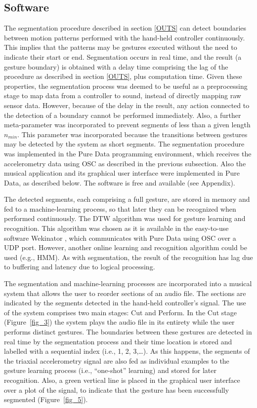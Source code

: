 \documentclass{nime-alternate_MANUSCRIPT} %
\begin{document}
\subsection{Software}

The segmentation procedure described in section \ref{OUTS} can detect boundaries between motion patterns performed with the hand-held controller continuously. This implies that the patterns may be gestures executed without the need to indicate their start or end. Segmentation occurs in real time, and the result (a gesture boundary) is obtained with a delay time comprising the lag of the procedure as described in section \ref{OUTS}, plus computation time. Given these properties, the segmentation process was deemed to be useful as a preprocessing stage to map data from a controller to sound, instead of directly mapping raw sensor data. However, because of the delay in the result, any action connected to the detection of a boundary cannot be performed immediately. Also, a further meta-parameter was incorporated to prevent segments of less than a given length $n_{min}$. This parameter was incorporated because the transitions between gestures may be detected by the system as short segments. The segmentation procedure was implemented in the Pure Data programming environment, which receives the accelerometry data using OSC as described in the previous subsection. Also the musical application and its graphical user interface were implemented in Pure Data, as described below. The software is free and available (see Appendix).  

The detected segments, each comprising a full gesture, are stored in memory and fed to a machine-learning process, so that later they can be recognized when performed continuously. The DTW algorithm was used for gesture learning and recognition. This algorithm was chosen as it is available in the easy-to-use software Wekinator \cite{Fiebrink_etal_2009, Wekinator_website}, which communicates with Pure Data using OSC over a UDP port. However, another online learning and recognition algorithm could be used (e.g., HMM). As with segmentation, the result of the recognition has lag due to buffering and latency due to logical processing.

The segmentation and machine-learning processes are incorporated into a musical system that allows the user to reorder sections of an audio file. The sections are indicated by the segments detected in the hand-held controller’s signal. The use of the system comprises two main stages: Cut and Perform. In the Cut stage (Figure~\ref{fig_3}) the system plays the audio file in its entirety while the user performs distinct gestures. The boundaries between these gestures are detected in real time by the segmentation process and their time location is stored and labelled with a sequential index (i.e., 1, 2, 3,…). As this happens, the segments of the triaxial accelerometry signal are also fed as individual examples to the gesture learning process (i.e., “one-shot” learning) and stored for later recognition. Also, a green vertical line is placed in the graphical user interface over a plot of the signal, to indicate that the gesture has been successfully segmented (Figure~\ref{fig_5}).
\end{document}
